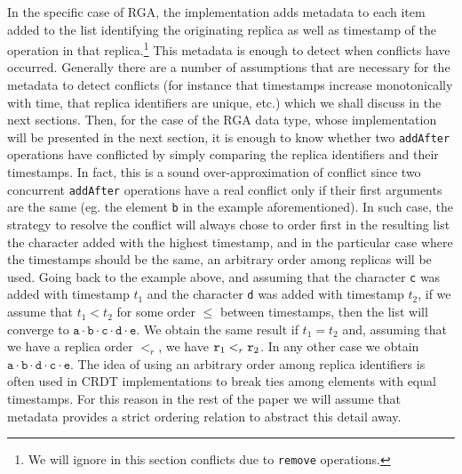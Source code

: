 

In the specific case of RGA, the implementation adds metadata to each
item added to the list identifying the originating replica as well as
timestamp of the operation in that replica.\footnote{We will ignore in
  this section conflicts due to \lstinline|remove| operations.}
%
This metadata is enough to detect when conflicts have occurred.
%
Generally there are a number of assumptions that are necessary for the
metadata to detect conflicts (for instance that timestamps increase
monotonically with time, that replica identifiers are unique, etc.)
which we shall discuss in the next sections.
%
Then, for the case of the RGA data type, whose implementation will be
presented in the next section, it is enough to know whether
two \lstinline|addAfter| operations have conflicted by simply
comparing the replica identifiers and their timestamps.
%
In fact, this is a sound over-approximation of conflict since two
concurrent \lstinline|addAfter| operations have a real conflict only
if their first arguments are the same (eg. the element \lstinline|b|
in the example aforementioned).
%
In such case, the strategy to resolve the conflict will always chose
to order first in the resulting list the character added with the
highest timestamp, and in the particular case where the timestamps
should be the same, an arbitrary order among replicas will be used.
%
Going back to the example above, and assuming that the character
\lstinline|c| was added with timestamp $t_1$ and the character
\lstinline|d| was added with timestamp $t_2$, if we assume that
$t_1 < t_2$ for some order $\leq$ between timestamps, then the list will
converge to $\mathtt{a \cdot b \cdot c \cdot d \cdot e}$.
%
We obtain the same result if $t_1 = t_2$ and, assuming that we have a replica
order $<_r$, we have $\mathtt{r}_1 <_r \mathtt{r}_2$.
%
In any other case we obtain $\mathtt{a \cdot b \cdot d \cdot c \cdot e}$.
%
The idea of using an arbitrary order among replica identifiers is
often used in CRDT implementations to break ties among elements with
equal timestamps.
%
For this reason in the rest of the paper we will assume that metadata
provides a strict ordering relation to abstract this detail away.

